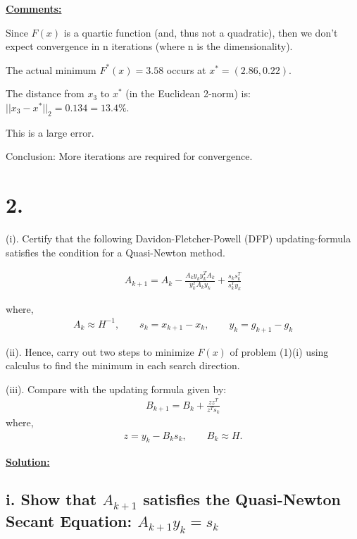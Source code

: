 \documentclass{article}
\begin{document}
\noindent
\textbf{\underline{Comments:}} 

Since $F(x)$ is a quartic function (and, thus not a quadratic), then we don't expect convergence in n iterations (where n is the dimensionality).

The actual minimum $F^*(x)= 3.58$ occurs at $x^* = (2.86, 0.22)$.

The distance from $x_3$ to $x^*$ (in the Euclidean 2-norm) is: $||x_3 - x^*||_2 = 0.134 = 13.4\%$.

This is a large error. 

Conclusion: More iterations are required for convergence.
\newpage

\section*{2.}
(i). Certify that the following Davidon-Fletcher-Powell (DFP) updating-formula satisfies the condition for a Quasi-Newton method.

\begin{align*}
  A_{k+1} = A_k 
  - \frac{A_k y_k y_k^T A_k}{y_k^T A_k y_k}  
  + \frac{s_k s_k^T}{s_k^T y_k}
\end{align*}

where,
\begin{align*}
  A_k \approx H^{-1}, \qquad s_k = x_{k+1} - x_k, \qquad y_k = g_{k+1} - g_k
\end{align*}

(ii). Hence, carry out two steps to minimize $F(x)$ of problem (1)(i) using calculus to find the minimum in each search direction.
\newline

(iii). Compare with the updating formula given by:
\begin{align*}
  B_{k+1} = B_k + \frac{z z^T}{z^T s_k}
\end{align*}
where,
\begin{align*}
  z = y_k - B_k s_k, \qquad B_k \approx H.
\end{align*}

\begin{center}
  \textbf{\underline{Solution:}}  
\end{center}

\subsection*{i. Show that $A_{k+1}$ satisfies the Quasi-Newton Secant Equation: $A_{k+1} y_k = s_k$}
\end{document}
